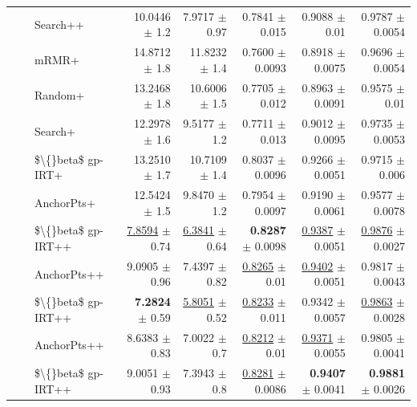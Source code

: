 \begin{longtable}{llp{}rrrrr}
 &  & Search++ & 10.0446 {\scriptsize $\pm$ 1.2} & 7.9717 {\scriptsize $\pm$ 0.97} & 0.7841 {\scriptsize $\pm$ 0.015} & 0.9088 {\scriptsize $\pm$ 0.01} & 0.9787 {\scriptsize $\pm$ 0.0054} \\
 &  & mRMR+ & 14.8712 {\scriptsize $\pm$ 1.8} & 11.8232 {\scriptsize $\pm$ 1.4} & 0.7600 {\scriptsize $\pm$ 0.0093} & 0.8918 {\scriptsize $\pm$ 0.0075} & 0.9696 {\scriptsize $\pm$ 0.0054} \\
 &  & Random+ & 13.2468 {\scriptsize $\pm$ 1.8} & 10.6006 {\scriptsize $\pm$ 1.5} & 0.7705 {\scriptsize $\pm$ 0.012} & 0.8963 {\scriptsize $\pm$ 0.0091} & 0.9575 {\scriptsize $\pm$ 0.01} \\
 &  & Search+ & 12.2978 {\scriptsize $\pm$ 1.6} & 9.5177 {\scriptsize $\pm$ 1.2} & 0.7711 {\scriptsize $\pm$ 0.013} & 0.9012 {\scriptsize $\pm$ 0.0095} & 0.9735 {\scriptsize $\pm$ 0.0053} \\
 &  & \$\textbackslash\{\}beta\$ gp-IRT+ & 13.2510 {\scriptsize $\pm$ 1.7} & 10.7109 {\scriptsize $\pm$ 1.4} & 0.8037 {\scriptsize $\pm$ 0.0096} & 0.9266 {\scriptsize $\pm$ 0.0051} & 0.9715 {\scriptsize $\pm$ 0.006} \\
 &  & AnchorPts+ & 12.5424 {\scriptsize $\pm$ 1.5} & 9.8470 {\scriptsize $\pm$ 1.2} & 0.7954 {\scriptsize $\pm$ 0.0097} & 0.9190 {\scriptsize $\pm$ 0.0061} & 0.9577 {\scriptsize $\pm$ 0.0078} \\
 &  & \$\textbackslash\{\}beta\$ gp-IRT++ & \underline{7.8594} {\scriptsize $\pm$ 0.74} & \underline{6.3841} {\scriptsize $\pm$ 0.64} & \textbf{0.8287} {\scriptsize $\pm$ 0.0098} & \underline{0.9387} {\scriptsize $\pm$ 0.0051} & \underline{0.9876} {\scriptsize $\pm$ 0.0027} \\
 &  & AnchorPts++ & 9.0905 {\scriptsize $\pm$ 0.96} & 7.4397 {\scriptsize $\pm$ 0.82} & \underline{0.8265} {\scriptsize $\pm$ 0.01} & \underline{0.9402} {\scriptsize $\pm$ 0.0051} & 0.9817 {\scriptsize $\pm$ 0.0043} \\
 &  & \$\textbackslash\{\}beta\$ gp-IRT++ & \textbf{7.2824} {\scriptsize $\pm$ 0.59} & \underline{5.8051} {\scriptsize $\pm$ 0.52} & \underline{0.8233} {\scriptsize $\pm$ 0.011} & 0.9342 {\scriptsize $\pm$ 0.0057} & \underline{0.9863} {\scriptsize $\pm$ 0.0028} \\
 &  & AnchorPts++ & 8.6383 {\scriptsize $\pm$ 0.83} & 7.0022 {\scriptsize $\pm$ 0.7} & \underline{0.8212} {\scriptsize $\pm$ 0.01} & \underline{0.9371} {\scriptsize $\pm$ 0.0055} & 0.9805 {\scriptsize $\pm$ 0.0041} \\
 &  & \$\textbackslash\{\}beta\$ gp-IRT++ & 9.0051 {\scriptsize $\pm$ 0.93} & 7.3943 {\scriptsize $\pm$ 0.8} & \underline{0.8281} {\scriptsize $\pm$ 0.0086} & \textbf{0.9407} {\scriptsize $\pm$ 0.0041} & \textbf{0.9881} {\scriptsize $\pm$ 0.0026} \\

\end{longtable}

